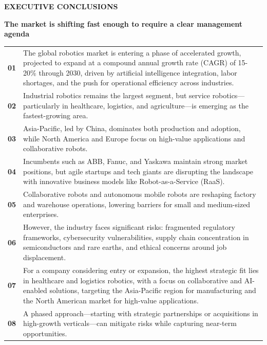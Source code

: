 \documentclass[10pt,a4paper]{article}
\begin{document}
{\textcolor{BOBlue}{\scriptsize\bfseries EXECUTIVE CONCLUSIONS}}\par\vspace{-1pt}
{\Large\sffamily\bfseries\color{BONavy} The market is shifting fast enough to require a clear management agenda}\par\vspace{4pt}
\vspace{2pt}{\color{BOBright}\rule{\linewidth}{1pt}}\vspace{5pt}
\begin{tabularx}{\linewidth}{p{13mm}Y}
\textcolor{BOBlue}{\bfseries 01} & {\small The global robotics market is entering a phase of accelerated growth, projected to expand at a compound annual growth rate (CAGR) of 15-20\% through 2030, driven by artificial intelligence integration, labor shortages, and the push for operational efficiency across industries.} \\[6pt]
\textcolor{BOBlue}{\bfseries 02} & {\small Industrial robotics remains the largest segment, but service robotics—particularly in healthcare, logistics, and agriculture—is emerging as the fastest-growing area.} \\[6pt]
\textcolor{BOBlue}{\bfseries 03} & {\small Asia-Pacific, led by China, dominates both production and adoption, while North America and Europe focus on high-value applications and collaborative robots.} \\[6pt]
\textcolor{BOBlue}{\bfseries 04} & {\small Incumbents such as ABB, Fanuc, and Yaskawa maintain strong market positions, but agile startups and tech giants are disrupting the landscape with innovative business models like Robot-as-a-Service (RaaS).} \\[6pt]
\textcolor{BOBlue}{\bfseries 05} & {\small Collaborative robots and autonomous mobile robots are reshaping factory and warehouse operations, lowering barriers for small and medium-sized enterprises.} \\[6pt]
\textcolor{BOBlue}{\bfseries 06} & {\small However, the industry faces significant risks: fragmented regulatory frameworks, cybersecurity vulnerabilities, supply chain concentration in semiconductors and rare earths, and ethical concerns around job displacement.} \\[6pt]
\textcolor{BOBlue}{\bfseries 07} & {\small For a company considering entry or expansion, the highest strategic fit lies in healthcare and logistics robotics, with a focus on collaborative and AI-enabled solutions, targeting the Asia-Pacific region for manufacturing and the North American market for high-value applications.} \\[6pt]
\textcolor{BOBlue}{\bfseries 08} & {\small A phased approach—starting with strategic partnerships or acquisitions in high-growth verticals—can mitigate risks while capturing near-term opportunities.} \\[6pt]
\end{tabularx}
\clearpage
\end{document}
